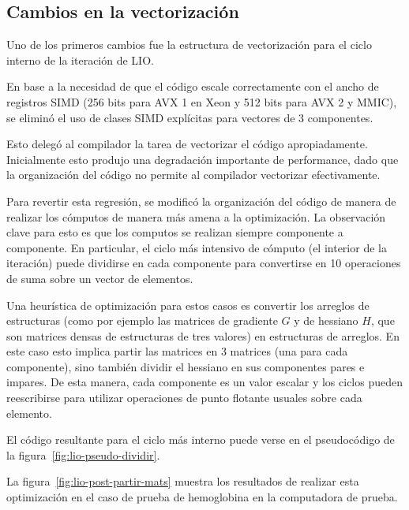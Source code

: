 \subsection{Cambios en la vectorizaci\'on}

Uno de los primeros cambios fue la estructura de vectorizaci\'on para el ciclo 
interno de la iteraci\'on de LIO.

En base a la necesidad de que el c\'odigo escale correctamente con el ancho de registros
SIMD (256 bits para AVX 1 en Xeon y 512 bits para AVX 2 y MMIC), se elimin\'o el
uso de clases SIMD expl\'icitas para vectores de 3 componentes. 

Esto deleg\'o al compilador la tarea de vectorizar el c\'odigo apropiadamente. Inicialmente
esto produjo una degradaci\'on importante de performance, dado que la organizaci\'on del
c\'odigo no permite al compilador vectorizar efectivamente. 

Para revertir esta regresi\'on, se modific\'o la organizaci\'on del c\'odigo de manera de
realizar los c\'omputos de manera m\'as amena a la optimizaci\'on. La observaci\'on clave
para esto es que los computos se realizan siempre componente a componente. En particular,
el ciclo m\'as intensivo de c\'omputo (el interior de la iteraci\'on) puede dividirse
en cada componente para convertirse en 10 operaciones de suma sobre un vector de
elementos. 

Una heur\'istica de optimizaci\'on para estos casos es convertir los arreglos de
estructuras (como por ejemplo las matrices de gradiente $G$ y de hessiano $H$, que
son matrices densas de estructuras de tres valores) en estructuras de arreglos.
En este caso esto implica partir las matrices en 3 matrices (una para cada
componente), sino tambi\'en dividir el hessiano en sus componentes pares e impares.
De esta manera, cada componente es un valor escalar y los ciclos pueden reescribirse
para utilizar operaciones de punto flotante usuales sobre cada elemento.

El c\'odigo resultante para el ciclo m\'as interno puede verse en el pseudoc\'odigo
de la figura~\ref{fig:lio-pseudo-dividir}. 


La figura~\ref{fig:lio-post-partir-mats} muestra los resultados de realizar esta
optimizaci\'on en el caso de prueba de hemoglobina en la computadora de prueba.


